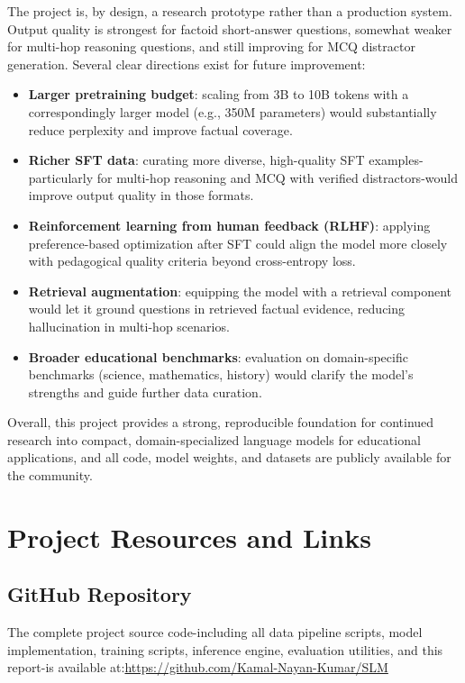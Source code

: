 \documentclass[12pt]{article}
\begin{document}
The project is, by design, a research prototype rather than a production system. Output quality is strongest for factoid short-answer questions, somewhat weaker for multi-hop reasoning questions, and still improving for MCQ distractor generation. Several clear directions exist for future improvement:
\begin{itemize}[leftmargin=1.2cm]
  \item \textbf{Larger pretraining budget}: scaling from 3B to 10B tokens with a correspondingly larger model (e.g., 350M parameters) would substantially reduce perplexity and improve factual coverage.
  \item \textbf{Richer SFT data}: curating more diverse, high-quality SFT examples-particularly for multi-hop reasoning and MCQ with verified distractors-would improve output quality in those formats.
  \item \textbf{Reinforcement learning from human feedback (RLHF)}: applying preference-based optimization after SFT could align the model more closely with pedagogical quality criteria beyond cross-entropy loss.
  \item \textbf{Retrieval augmentation}: equipping the model with a retrieval component would let it ground questions in retrieved factual evidence, reducing hallucination in multi-hop scenarios.
  \item \textbf{Broader educational benchmarks}: evaluation on domain-specific benchmarks (science, mathematics, history) would clarify the model's strengths and guide further data curation.
\end{itemize}

Overall, this project provides a strong, reproducible foundation for continued research into compact, domain-specialized language models for educational applications, and all code, model weights, and datasets are publicly available for the community.

\section{Project Resources and Links}

\subsection{GitHub Repository}
The complete project source code-including all data pipeline scripts, model implementation, training scripts, inference engine, evaluation utilities, and this report-is available at:\url{https://github.com/Kamal-Nayan-Kumar/SLM}
\end{document}
